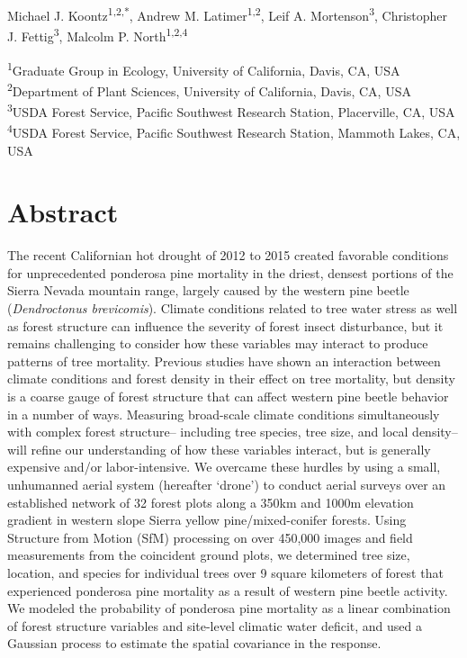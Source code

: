 \documentclass[twoside,12pt,final]{ucthesis-CA2012}
\begin{document}
\begin{ucmainmatter}
Michael J. Koontz\textsuperscript{1,2,*}, Andrew M.
Latimer\textsuperscript{1,2}, Leif A. Mortenson\textsuperscript{3},
Christopher J. Fettig\textsuperscript{3}, Malcolm P.
North\textsuperscript{1,2,4}

\textsuperscript{1}Graduate Group in Ecology, University of California,
Davis, CA, USA\\
\textsuperscript{2}Department of Plant Sciences, University of
California, Davis, CA, USA\\
\textsuperscript{3}USDA Forest Service, Pacific Southwest Research
Station, Placerville, CA, USA\\
\textsuperscript{4}USDA Forest Service, Pacific Southwest Research
Station, Mammoth Lakes, CA, USA

\section{Abstract}\label{abstract-1}

The recent Californian hot drought of 2012 to 2015 created favorable
conditions for unprecedented ponderosa pine mortality in the driest,
densest portions of the Sierra Nevada mountain range, largely caused by
the western pine beetle (\emph{Dendroctonus brevicomis}). Climate
conditions related to tree water stress as well as forest structure can
influence the severity of forest insect disturbance, but it remains
challenging to consider how these variables may interact to produce
patterns of tree mortality. Previous studies have shown an interaction
between climate conditions and forest density in their effect on tree
mortality, but density is a coarse gauge of forest structure that can
affect western pine beetle behavior in a number of ways. Measuring
broad-scale climate conditions simultaneously with complex forest
structure-- including tree species, tree size, and local density-- will
refine our understanding of how these variables interact, but is
generally expensive and/or labor-intensive. We overcame these hurdles by
using a small, unhumanned aerial system (hereafter `drone') to conduct
aerial surveys over an established network of 32 forest plots along a
350km and 1000m elevation gradient in western slope Sierra yellow
pine/mixed-conifer forests. Using Structure from Motion (SfM) processing
on over 450,000 images and field measurements from the coincident ground
plots, we determined tree size, location, and species for individual
trees over 9 square kilometers of forest that experienced ponderosa pine
mortality as a result of western pine beetle activity. We modeled the
probability of ponderosa pine mortality as a linear combination of
forest structure variables and site-level climatic water deficit, and
used a Gaussian process to estimate the spatial covariance in the
response.


\end{ucmainmatter}
\end{document}
